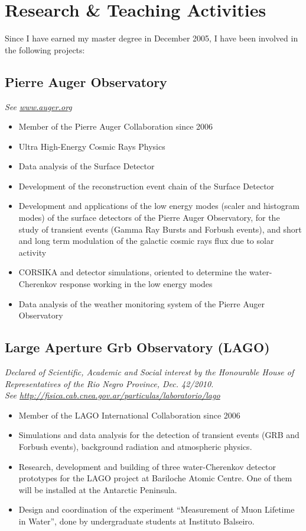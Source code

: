 \ifeng
\section*{Research \& Teaching Activities}

Since I have earned my master degree in December 2005, I have been involved in
the following projects:

\subsection*{Pierre Auger Observatory}

{\small{\textit{See \href{http://www.auger.org/}{www.auger.org}}}}
\begin{itemize}
\item Member of the Pierre Auger Collaboration since 2006
\item Ultra High-Energy Cosmic Rays Physics 
\item Data analysis of the Surface Detector
\item Development of the reconstruction event chain of the Surface Detector
\item Development and applications of the low energy modes (scaler and histogram
modes) of the surface detectors of the Pierre Auger Observatory, for the study
of transient events (Gamma Ray Bursts and Forbush events), and short and long
term modulation of the galactic cosmic rays flux due to solar activity
\item CORSIKA and detector simulations, oriented to determine the
water-Cherenkov response working in the low energy modes
\item Data analysis of the weather monitoring system of the Pierre Auger
Observatory
\end{itemize}

\subsection*{Large Aperture Grb Observatory (LAGO)}
{\emph{Declared of Scientific, Academic and Social interest by the Honourable
House of Representatives of the Rio Negro Province, Dec. 42/2010.}}\\
{\small{\textit{See
\href{http://fisica.cab.cnea.gov.ar/particulas/laboratorio/lago}
{http://fisica.cab.cnea.gov.ar/particulas/laboratorio/lago}}}}\\
\begin{itemize}
\item Member of the LAGO International Collaboration since 2006
\item Simulations and data analysis for the detection of transient events
(GRB and Forbush events), background radiation and atmospheric physics.
\item Research, development and building of three water-Cherenkov detector
prototypes for the LAGO project at Bariloche Atomic Centre. One of them will be
installed at the Antarctic Peninsula.
\item Design and coordination of the experiment ``Measurement of Muon Lifetime in
Water'', done by undergraduate students at Instituto Balseiro.
\end{itemize}

